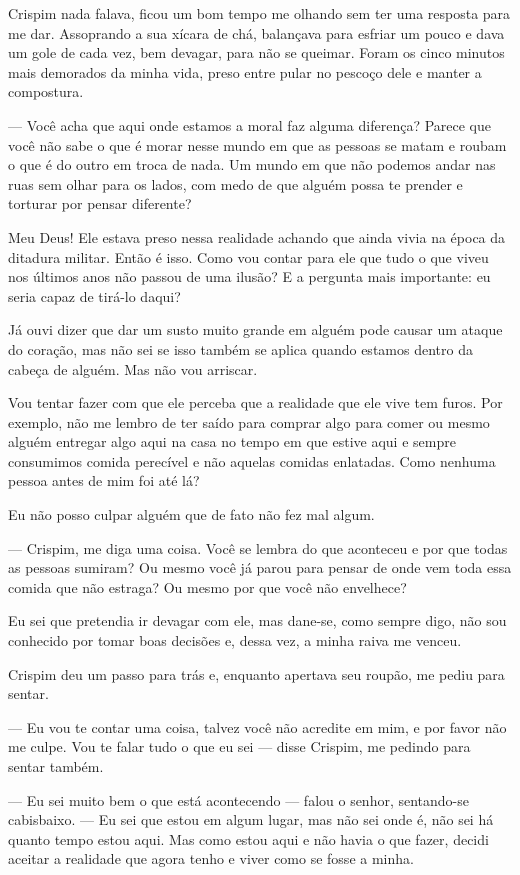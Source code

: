Crispim nada falava, ficou um bom tempo me olhando sem ter uma resposta para me dar. Assoprando a sua xícara de chá, balançava para esfriar um pouco e dava um gole de cada vez, bem devagar, para não se queimar. Foram os cinco minutos mais demorados da minha vida, preso entre pular no pescoço dele e manter a compostura.

— Você acha que aqui onde estamos a moral faz alguma diferença? Parece que você não sabe o que é morar nesse mundo em que as pessoas se matam e roubam o que é do outro em troca de nada. Um mundo em que não podemos andar nas ruas sem olhar para os lados, com medo de que alguém possa te prender e torturar por pensar diferente?

Meu Deus! Ele estava preso nessa realidade achando que ainda vivia na época da ditadura militar. Então é isso. Como vou contar para ele que tudo o que viveu nos últimos anos não passou de uma ilusão? E a pergunta mais importante: eu seria capaz de tirá-lo daqui?

Já ouvi dizer que dar um susto muito grande em alguém pode causar um ataque do coração, mas não sei se isso também se aplica quando estamos dentro da cabeça de alguém. Mas não vou arriscar.

Vou tentar fazer com que ele perceba que a realidade que ele vive tem furos. Por exemplo, não me lembro de ter saído para comprar algo para comer ou mesmo alguém entregar algo aqui na casa no tempo em que estive aqui e sempre consumimos comida perecível e não aquelas comidas enlatadas. Como nenhuma pessoa antes de mim foi até lá?

Eu não posso culpar alguém que de fato não fez mal algum.

— Crispim, me diga uma coisa. Você se lembra do que aconteceu e por que todas as pessoas sumiram? Ou mesmo você já parou para pensar de onde vem toda essa comida que não estraga? Ou mesmo por que você não envelhece?

Eu sei que pretendia ir devagar com ele, mas dane-se, como sempre digo, não sou conhecido por tomar boas decisões e, dessa vez, a minha raiva me venceu.

Crispim deu um passo para trás e, enquanto apertava seu roupão, me pediu para sentar.

— Eu vou te contar uma coisa, talvez você não acredite em mim, e por favor não me culpe. Vou te falar tudo o que eu sei — disse Crispim, me pedindo para sentar também.

— Eu sei muito bem o que está acontecendo — falou o senhor, sentando-se cabisbaixo. — Eu sei que estou em algum lugar, mas não sei onde é, não sei há quanto tempo estou aqui. Mas como estou aqui e não havia o que fazer, decidi aceitar a realidade que agora tenho e viver como se fosse a minha.

